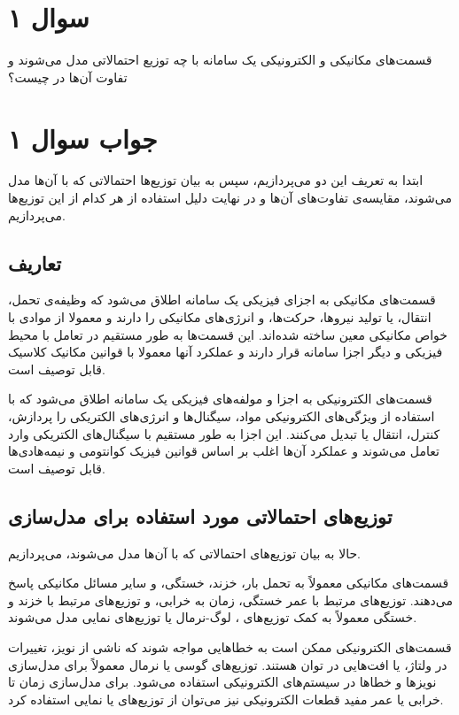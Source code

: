 \section*{سوال ۱}

قسمت‌های مکانیکی و الکترونیکی یک سامانه با چه توزیع احتمالاتی مدل می‌شوند و تفاوت آن‌ها در چیست؟

\section*{جواب سوال ۱}

ابتدا به تعریف این دو می‌پردازیم، سپس به بیان توزیع‌ها احتمالاتی که با آن‌ها مدل می‌شوند، مقایسه‌ی تفاوت‌های آن‌ها و در نهایت دلیل استفاده از هر کدام از این توزیع‌ها می‌پردازیم.

\subsection*{تعاریف}

قسمت‌های مکانیکی به اجزای فیزیکی یک سامانه اطلاق می‌شود که وظیفه‌ی تحمل، انتقال، یا تولید نیروها، حرکت‌ها، و انرژی‌های مکانیکی را دارند و معمولا از موادی با خواص مکانیکی معین ساخته شده‌اند. این قسمت‌ها به طور مستقیم در تعامل با محیط فیزیکی و دیگر اجزا سامانه قرار دارند و عملکرد آنها معمولا با قوانین مکانیک کلاسیک قابل توصیف است.

قسمت‌های الکترونیکی به اجزا و مولفه‌های فیزیکی یک سامانه اطلاق می‌شود که با استفاده از ویژگی‌های الکترونیکی مواد، سیگنال‌ها و انرژی‌های الکتریکی را پردازش، کنترل، انتقال یا تبدیل می‌کنند. این اجزا به طور مستقیم با سیگنال‌های الکتریکی وارد تعامل می‌شوند و عملکرد آن‌ها اغلب بر اساس قوانین فیزیک کوانتومی و نیمه‌هادی‌ها قابل توصیف است.

\subsection*{توزیع‌های احتمالاتی مورد استفاده برای مدل‌سازی}

حالا به بیان توزیع‌های احتمالاتی که با آن‌ها مدل می‌شوند، می‌پردازیم.

قسمت‌های مکانیکی معمولاً به تحمل بار، خزند، خستگی، و سایر مسائل مکانیکی پاسخ می‌دهند.
توزیع‌های مرتبط با عمر خستگی، زمان به خرابی، و توزیع‌های مرتبط با خزند و خستگی معمولاً به کمک توزیع‌های
، لوگ-نرمال یا توزیع‌های نمایی مدل می‌شوند.

قسمت‌های الکترونیکی ممکن است به خطاهایی مواجه شوند که ناشی از نویز، تغییرات در ولتاژ، یا افت‌هایی در توان هستند.
توزیع‌های گوسی یا نرمال معمولاً برای مدل‌سازی نویز‌ها و خطاها در سیستم‌های الکترونیکی استفاده می‌شود.
برای مدل‌سازی زمان تا خرابی یا عمر مفید قطعات الکترونیکی نیز می‌توان از توزیع‌های
یا نمایی استفاده کرد.

